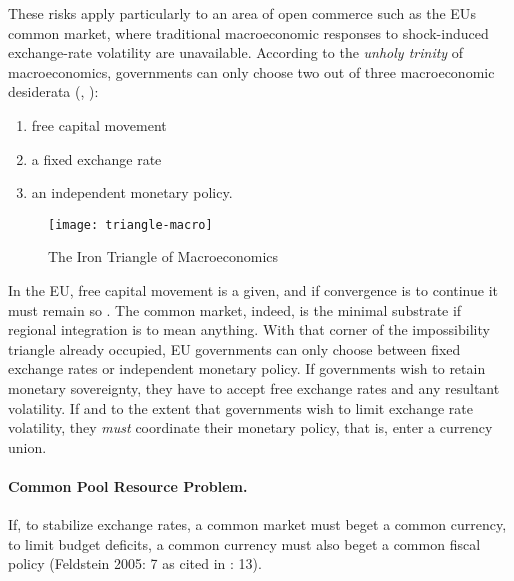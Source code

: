 These risks apply particularly to an area of open commerce such as the \gls{EU}s common market, where traditional macroeconomic responses to shock-induced exchange-rate volatility are unavailable. According to the \emph{unholy trinity} of macroeconomics, governments can only choose two out of three macroeconomic desiderata (\citealt{Mundell1963}, \citealt{Fleming1962}):
\begin{enumerate}
	\item free capital movement
	\item a fixed exchange rate
	\item an independent monetary policy.
\end{enumerate}

 \begin{figure}[htbp]
	\centering
	\texttt{[image: triangle-macro]}  
	\caption{The Iron Triangle of Macroeconomics}
	\label{fig:triangle-macro}
\end{figure} 

In the \gls{EU}, free capital movement is a given, and if convergence is to continue it must remain so \citep{Abiad2007}. The common market, indeed, is the minimal substrate if regional integration is to mean anything. With that corner of the impossibility triangle already occupied, \gls{EU} governments can only choose between fixed exchange rates or independent monetary policy. If governments wish to retain monetary sovereignty, they have to accept free exchange rates and any resultant volatility. If and to the extent that governments wish to limit exchange rate volatility, they \emph{must} coordinate their monetary policy, that is, enter a currency union.

\paragraph[Fiscal-CPR]{Common Pool Resource Problem.}  \label{sec:Fiscal-CPR} If, to stabilize exchange rates, a common market must beget a common currency, to limit budget deficits, a common currency must also beget a common fiscal policy (Feldstein 2005: 7 as cited in \citealt{Begg2008}: 13). 

